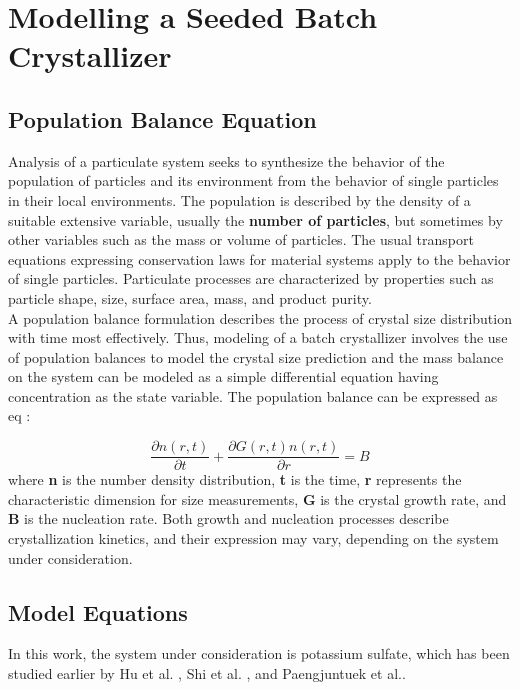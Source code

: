 
\chapter{Modelling a Seeded Batch Crystallizer}


\section{Population Balance Equation}

Analysis of a particulate system seeks to synthesize the behavior of the population of particles and its environment from the behavior of single particles in their local environments. The population is described by the density of a suitable extensive variable, usually the \textbf{number of particles}, but sometimes by other variables such as the mass or volume of particles. The usual transport equations expressing conservation laws for material systems apply to the behavior of single particles. Particulate processes are characterized by properties such as particle shape, size, surface area, mass, and product purity. \\
A population balance formulation describes the process of crystal size distribution with time most effectively. Thus, modeling of a batch crystallizer involves the use of population balances to model the crystal size prediction and the mass balance on the system can be modeled as a simple differential equation having concentration as the state variable.
The population balance can be expressed as eq :

\begin{equation} \label{populationbalance}
	\frac{\partial{n(r,t)}}{\partial{t}} + \frac{\partial{G(r,t)n(r,t)}}{\partial{r}} = B

\end{equation}
where \textbf{n} is the number density distribution, \textbf{t} is the time, \textbf{r} represents the characteristic dimension for size measurements, \textbf{G} is the crystal growth rate, and \textbf{B} is the nucleation rate. Both growth and nucleation processes describe crystallization kinetics, and their expression may vary, depending on the system under consideration.

\section{Model Equations}

In this work, the system under consideration is potassium sulfate, which has been studied earlier by Hu et al. \cite{hu}, Shi et al. \cite{shi}, and Paengjuntuek et al.\cite{paeng}. \\

